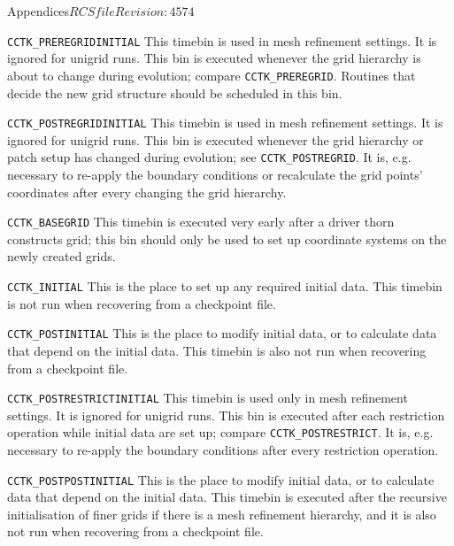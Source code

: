 \begin{cactuspart}{Appendices}{$RCSfile$}{$Revision: 4574 $}
\begin{Lentry}
\item[{\tt CCTK\_PREREGRIDINITIAL}]
        This timebin is used in mesh refinement settings.  It is
        ignored for unigrid runs.  This bin is executed whenever the
        grid hierarchy is about to change during evolution; compare
        {\tt CCTK\_PREREGRID}.  Routines that decide the
        new grid structure should be scheduled in this bin.

\item[{\tt CCTK\_POSTREGRIDINITIAL}]
        This timebin is used in mesh refinement settings.  It is
        ignored for unigrid runs.  This bin is executed whenever the
        grid hierarchy or patch setup has changed during evolution;
        see {\tt CCTK\_POSTREGRID}.  It is, e.g.
        necessary to re-apply the boundary conditions or recalculate
        the grid points' coordinates after every changing the grid
        hierarchy.

\item[{\tt CCTK\_BASEGRID}]
        This timebin is executed very early after a driver thorn
        constructs grid; this bin should only be used to set up
        coordinate systems on the newly created grids.

\item[{\tt CCTK\_INITIAL}] 
        This is the place to set up any required initial data. This timebin
        is not run when recovering from a checkpoint file.

\item[{\tt CCTK\_POSTINITIAL}]
        This is the place to modify initial data, or to calculate data
        that depend on the initial data.  This timebin is also not run
        when recovering from a checkpoint file.
        
\item[{\tt CCTK\_POSTRESTRICTINITIAL}]
        This timebin is used only in mesh refinement settings.  It is
        ignored for unigrid runs.  This bin is executed after each
        restriction operation while initial data are set up; compare
        {\tt CCTK\_POSTRESTRICT}.  It is,
        e.g. necessary to re-apply the
        boundary conditions after every restriction operation.

\item[{\tt CCTK\_POSTPOSTINITIAL}]
        This is the place to modify initial data, or to calculate data
        that depend on the initial data.  This timebin is executed
        after the recursive initialisation of finer grids if there is
        a mesh refinement hierarchy, and it is also not run
        when recovering from a checkpoint file.


\end{Lentry}
\end{cactuspart}
